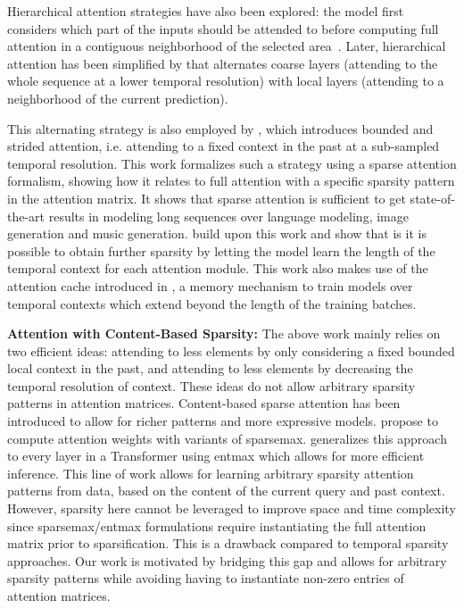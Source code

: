 \documentclass[a4paper]{article}
\begin{document}
Hierarchical attention strategies have also been explored: the model first considers
which part of the inputs should be attended to before computing full attention in a
contiguous neighborhood of the selected area~\citep{gregor2015draw,vinyals2015show,luong2015effective}.
Later, hierarchical attention has been simplified by \citet{liu2018generating} that 
alternates coarse layers (attending to the whole sequence at a lower temporal resolution) 
with local layers (attending to a neighborhood of the current prediction).

This alternating strategy is also employed by \citet{child2019generating}, which
introduces bounded and strided attention, i.e. attending to a fixed context in the past
at a sub-sampled temporal resolution. This work formalizes such a strategy using a
sparse attention formalism, showing how it relates to full attention with
a specific sparsity pattern in the attention matrix. It shows that sparse attention 
is sufficient to get state-of-the-art results in modeling long sequences over
language modeling, image generation and music generation. \citet{sukhbaatar2019adaptive}
build upon this work and show that is it is possible to obtain further sparsity
by letting the model learn the length of the temporal context for each attention module. 
This work also makes use of the attention cache introduced in 
\citet{dai2019transformer}, a memory mechanism to train models over 
temporal contexts which extend beyond the length of the training batches.

{\bf Attention with Content-Based Sparsity:} 
The above work mainly relies on two efficient ideas: attending to 
less elements by only considering a fixed bounded local context in the past, and 
attending to less elements by decreasing the temporal resolution of context.
These ideas do not allow arbitrary sparsity patterns in attention matrices. Content-based
sparse attention has been introduced to allow for richer patterns and more expressive models.
\citet{martins-kreutzer-2017-learning, malaviya-etal-2018-sparse} propose to compute attention
weights with variants of sparsemax. \citet{correia2019adaptively} generalizes this approach to
every layer in a Transformer using entmax which allows for more efficient inference.
This line of work allows for learning arbitrary sparsity attention patterns from data, based on
the content of the current query and past context. However, sparsity here cannot be leveraged
to improve space and time complexity since sparsemax/entmax formulations require instantiating
the full attention matrix prior to sparsification. This is a drawback compared to temporal
sparsity approaches. Our work is motivated by bridging this gap and allows for arbitrary sparsity
patterns while avoiding having to instantiate non-zero entries of attention matrices.
\end{document}
